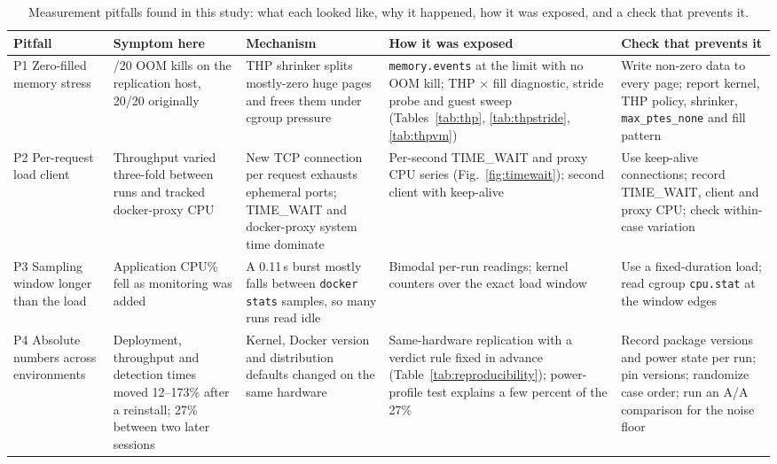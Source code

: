 \documentclass[conference]{IEEEtran}
\begin{document}
\begin{table}[t]
\centering
\caption{Measurement pitfalls found in this study: what each looked like, why it
happened, how it was exposed, and a check that prevents it.}
\label{tab:pitfalls}
\small
\begin{tabular}{@{}>{\raggedright\arraybackslash}p{}>{\raggedright\arraybackslash}p{}>{\raggedright\arraybackslash}p{}>{\raggedright\arraybackslash}p{}>{\raggedright\arraybackslash}p{}@{}}
\toprule
Pitfall & Symptom here & Mechanism & How it was exposed & Check that prevents it \\
\midrule
P1 Zero-filled memory stress &
0/20 OOM kills on the replication host, 20/20 originally &
THP shrinker splits mostly-zero huge pages and frees them under cgroup pressure &
\texttt{memory.events} at the limit with no OOM kill; THP $\times$ fill diagnostic, stride probe and guest sweep (Tables~\ref{tab:thp}, \ref{tab:thpstride}, \ref{tab:thpvm}) &
Write non-zero data to every page; report kernel, THP policy, shrinker, \texttt{max\_ptes\_none} and fill pattern \\
P2 Per-request load client &
Throughput varied three-fold between runs and tracked docker-proxy CPU &
New TCP connection per request exhausts ephemeral ports; TIME\_WAIT and docker-proxy system time dominate &
Per-second TIME\_WAIT and proxy CPU series (Fig.~\ref{fig:timewait}); second client with keep-alive &
Use keep-alive connections; record TIME\_WAIT, client and proxy CPU; check within-case variation \\
P3 Sampling window longer than the load &
Application CPU\% fell as monitoring was added &
A 0.11\,s burst mostly falls between \texttt{docker stats} samples, so many runs read idle &
Bimodal per-run readings; kernel counters over the exact load window &
Use a fixed-duration load; read cgroup \texttt{cpu.stat} at the window edges \\
P4 Absolute numbers across environments &
Deployment, throughput and detection times moved 12--173\% after a reinstall; 27\% between two later sessions &
Kernel, Docker version and distribution defaults changed on the same hardware &
Same-hardware replication with a verdict rule fixed in advance (Table~\ref{tab:reproducibility}); power-profile test explains a few percent of the 27\% &
Record package versions and power state per run; pin versions; randomize case order; run an A/A comparison for the noise floor \\
\bottomrule
\end{tabular}
\end{table}
\end{document}
